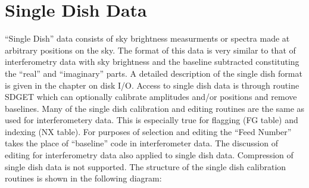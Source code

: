 \section{Single Dish Data}

   ``Single Dish'' data consists of sky brightness measurments or
spectra made at arbitrary positions on the sky.  The format of this
data is very similar to that of interferometry data with sky
brightness and the baseline subtracted constituting the ``real'' and
``imaginary'' parts.  A detailed description of the single dish format
is given in the chapter on disk I/O.  Access to single dish data is
through routine SDGET which can optionally calibrate
amplitudes and/or positions and remove baselines.  Many of the single
dish calibration and editing routines are the same as used for
interferometery data.  This is especially true for flagging (FG
table) and indexing (NX table).  For
purposes of selection and editing the ``Feed Number'' takes the place
of ``baseline'' code in interferometer data.  The discussion of
editing for interferometry data also applied to single dish data.
Compression of single dish data is not supported.  The
structure of the single dish calibration routines is shown in the
following diagram:

